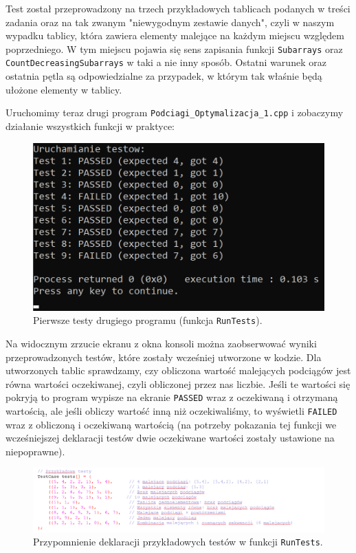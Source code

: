 \documentclass[a4paper,12pt]{article}
\begin{document}
Test został przeprowadzony na trzech przykładowych tablicach podanych w treści zadania oraz na tak zwanym "niewygodnym zestawie danych", czyli w naszym wypadku tablicy, która zawiera elementy malejące na każdym miejscu względem poprzedniego. W tym miejscu pojawia się sens zapisania funkcji \texttt{Subarrays} oraz \texttt{CountDecreasingSubarrays} w taki a nie inny sposób. Ostatni warunek oraz ostatnia pętla są odpowiedzialne za przypadek, w którym tak właśnie będą ułożone elementy w tablicy.

\newpage

Uruchomimy teraz drugi program \texttt{Podciagi\_Optymalizacja\_1.cpp} i zobaczymy działanie wszystkich funkcji w praktyce:

\begin{figure}[H]
    \centering
    \includegraphics[width=1\textwidth]{Test1.png}
    \caption{Pierwsze testy drugiego programu (funkcja \texttt{RunTests}).}
    \label{fig:Test1}
\end{figure}

Na widocznym zrzucie ekranu z okna konsoli można zaobserwować wyniki przeprowadzonych testów, które zostały wcześniej utworzone w kodzie. Dla utworzonych tablic sprawdzamy, czy obliczona wartość malejących podciągów jest równa wartości oczekiwanej, czyli obliczonej przez nas liczbie. Jeśli te wartości się pokryją to program wypisze na ekranie \texttt{PASSED} wraz z oczekiwaną i otrzymaną wartością, ale jeśli obliczy wartość inną niż oczekiwaliśmy, to wyświetli \texttt{FAILED} wraz z obliczoną i oczekiwaną wartością (na potrzeby pokazania tej funkcji we wcześniejszej deklaracji testów dwie oczekiwane wartości zostały ustawione na niepoprawne).
\rule{0cm}{0.1cm} %
\begin{figure}[H]
    \centering
    \includegraphics[width=1\textwidth]{Test2.png}
    \caption{Przypomnienie deklaracji przykładowych testów w funkcji \texttt{RunTests}.}
    \label{fig:Test2}
\end{figure}
\end{document}

